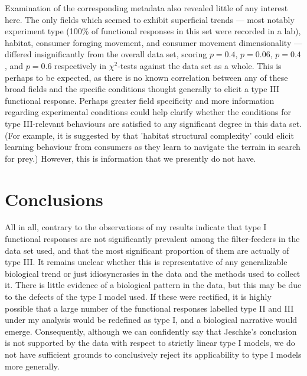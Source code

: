 \documentclass[11pt]{article}
\begin{document}
    Examination of the corresponding metadata also revealed little of any interest here. The only fields which seemed to exhibit superficial trends — most notably experiment type (100\% of functional responses in this set were recorded in a lab), habitat, consumer foraging movement, and consumer movement dimensionality — differed insignificantly from the overall data set, scoring $p=0.4$, $p=0.06$, $p=0.4$, and $p=0.6$ respectively in $\chi^2$-tests against the data set as a whole. This is perhaps to be expected, as there is no known correlation between any of these broad fields and the specific conditions thought generally to elicit a type III functional response. Perhaps greater field specificity and more information regarding experimental conditions could help clarify whether the conditions for type III-relevant behaviours are satisfied to any significant degree in this data set. (For example, it is suggested by \citet{pawar2012dimensionality} that 'habitat structural complexity' could elicit learning behaviour from consumers as they learn to navigate the terrain in search for prey.) However, this is information that we presently do not have.
    
    \section{Conclusions}
    
    All in all, contrary to the observations of \citet{jeschke2004consumer} my results indicate that type I functional responses are not significantly prevalent among the filter-feeders in the data set used, and that the most significant proportion of them are actually of type III. It remains unclear whether this is representative of any generalizable biological trend or just idiosyncrasies in the data and the methods used to collect it. There is little evidence of a biological pattern in the data, but this may be due to the defects of the type I model used. If these were rectified, it is highly possible that a large number of the functional responses labelled type II and III under my analysis would be redefined as type I, and a biological narrative would emerge. Consequently, although we can confidently say that Jeschke's conclusion is not supported by the data with respect to strictly linear type I models, we do not have sufficient grounds to conclusively reject its applicability to type I models more generally.

    \newpage
    
    
    
\end{document}
